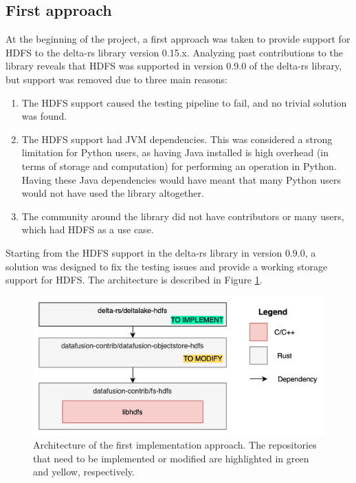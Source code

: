 \subsection{First approach}
At the beginning of the project, a first approach was taken to provide support for \gls{HDFS} to the delta-rs library version 0.15.x. Analyzing past contributions to the library reveals that \gls{HDFS} was supported in version 0.9.0 of the delta-rs library, but support was removed due to three main reasons:
\begin{enumerate}
  \item The \gls{HDFS} support caused the testing pipeline to fail, and no trivial solution was found.
  \item The \gls{HDFS} support had \gls{JVM} dependencies. This was considered a strong limitation for Python users, as having Java installed is high overhead (in terms of storage and computation) for performing an operation in Python. Having these Java dependencies would have meant that many Python users would not have used the library altogether.
  \item The community around the library did not have contributors or many users, which had \gls{HDFS} as a use case.
\end{enumerate}
Starting from the \gls{HDFS} support in the delta-rs library in version 0.9.0, a solution was designed to fix the testing issues and provide a working storage support for \gls{HDFS}. The architecture is described in Figure \ref{fig:approach_1_solution_schema}. 

\begin{figure}[!ht]
  \begin{center}
    \includegraphics[width=\textwidth]{figures/4-implementation/approach1_solution_schema.png}
  \caption[First solution architecture]{Architecture of the first implementation approach. The repositories that need to be implemented or modified are highlighted in green and yellow, respectively.}
  \label{fig:approach_1_solution_schema}
  \end{center}
\end{figure}


